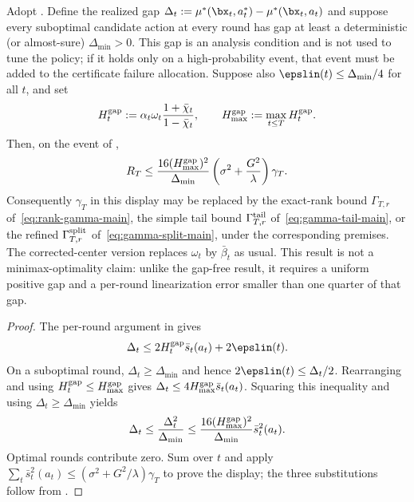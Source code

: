\begin{corollary}
\label{cor:gap-dependent-exact-current}
Adopt .  Define the realized gap
$\Delta_t:=\mu^*(\bx_t,a_t^*)-\mu^*(\bx_t,a_t)$ and suppose every
suboptimal candidate action at every round has gap at least a deterministic
(or almost-sure) $\Delta_{\min}>0$.  This gap is an analysis condition and is
not used to tune the policy; if it holds only on a high-probability event, that
event must be added to the certificate failure allocation.  Suppose also
$\epslin(t)\le\Delta_{\min}/4$ for all $t$, and set
\[
 H_t^{\rm gap}:=\alpha_t\omega_t
 \frac{1+\bar\chi_t}{1-\bar\chi_t},\qquad
 H_{\max}^{\rm gap}:=\max_{t\le T}H_t^{\rm gap}.
\]
Then, on the event of ,
\begin{equation}\label{eq:gap-dependent-exact-current}
 R_T\le\frac{16(H_{\max}^{\rm gap})^2}{\Delta_{\min}}
 \left(\sigma^2+\frac{G^2}{\lambda}\right)\gamma_T.
\end{equation}
Consequently $\gamma_T$ in this display may be replaced by the exact-rank
bound $\Gamma_{T,r}$ of~\eqref{eq:rank-gamma-main}, the simple tail bound
$\Gamma^{\rm tail}_{T,r}$ of~\eqref{eq:gamma-tail-main}, or the refined
$\Gamma^{\rm split}_{T,r}$ of~\eqref{eq:gamma-split-main}, under the
corresponding premises.  The corrected-center version replaces $\omega_t$ by
$\bar\beta_t$ as usual.  This result is not a minimax-optimality claim: unlike
the gap-free result, it requires a uniform positive gap and a per-round
linearization error smaller than one quarter of that gap.
\end{corollary}
\begin{proof}
The per-round argument in
 gives
\[
 \Delta_t\le2H_t^{\rm gap}\bar s_t(a_t)+2\epslin(t).
\]
On a suboptimal round, $\Delta_t\ge\Delta_{\min}$ and hence
$2\epslin(t)\le\Delta_t/2$.  Rearranging and using
$H_t^{\rm gap}\le H_{\max}^{\rm gap}$ gives
$\Delta_t\le4H_{\max}^{\rm gap}\bar s_t(a_t)$.  Squaring this inequality and using
$\Delta_t\ge\Delta_{\min}$ yields
\[
 \Delta_t\le\frac{\Delta_t^2}{\Delta_{\min}}
 \le\frac{16(H_{\max}^{\rm gap})^2}{\Delta_{\min}}\bar s_t^2(a_t).
\]
Optimal rounds contribute zero.  Sum over $t$ and apply
$\sum_t\bar s_t^2(a_t)\le
(\sigma^2+G^2/\lambda)\gamma_T$ to prove the display; the three substitutions
follow from .
\end{proof}

